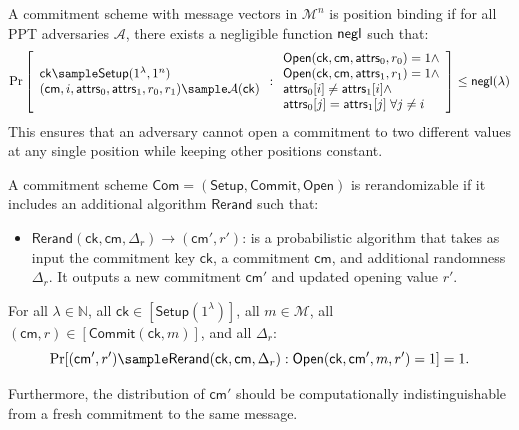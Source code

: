\begin{definition}\label{def:position-binding}
A commitment scheme with message vectors in $\mathcal{M}^n$ is position binding if for all PPT adversaries $\mathcal{A}$, there exists a negligible function $\mathsf{negl}$ such that:
\[
    \Pr
    \left[
        \begin{array}{l}
        \mathsf{ck} \sample \mathsf{Setup}(1^\lambda, 1^n) \\
        (\mathsf{cm}, i, \attrs_0, \attrs_1, r_0, r_1) \sample \mathcal{A}(\mathsf{ck}) 
        \end{array}
        : \begin{array}{l}
            \mathsf{Open}(\mathsf{ck}, \mathsf{cm}, \attrs_0, r_0) = 1 \land \\
            \mathsf{Open}(\mathsf{ck}, \mathsf{cm}, \attrs_1, r_1) = 1 \land \\
            \attrs_0[i] \neq \attrs_1[i] \land \\
            \attrs_0[j] = \attrs_1[j] \; \forall j \neq i
          \end{array}
    \right] \leq \negl(\lambda)
\]
This ensures that an adversary cannot open a commitment to two different values at any single position while keeping other positions constant.
\end{definition}


\begin{definition}[Rerandomizability]
A commitment scheme $\mathsf{Com} = (\mathsf{Setup}, \mathsf{Commit}, \mathsf{Open})$ is rerandomizable if it includes an additional algorithm $\mathsf{Rerand}$ such that:

\begin{itemize}
\item $\mathsf{Rerand}(\mathsf{ck}, \mathsf{cm}, \Delta_r) \rightarrow (\mathsf{cm}', r')$: is a probabilistic algorithm that takes as input the commitment key $\mathsf{ck}$, a commitment $\mathsf{cm}$, and additional randomness $\Delta_r$. It outputs a new commitment $\mathsf{cm}'$ and updated opening value $r'$.
\end{itemize}

For all $\lambda \in \mathbb{N}$, all $\mathsf{ck} \in [\mathsf{Setup}(1^\lambda)]$, all $m \in \mathcal{M}$, all $(\mathsf{cm}, r) \in [\mathsf{Commit}(\mathsf{ck}, m)]$, and all $\Delta_r$:
$$\Pr[(\mathsf{cm}', r') \sample \mathsf{Rerand}(\mathsf{ck}, \mathsf{cm}, \Delta_r) : \mathsf{Open}(\mathsf{ck}, \mathsf{cm}', m, r') = 1] = 1.$$

Furthermore, the distribution of $\mathsf{cm}'$ should be computationally indistinguishable from a fresh commitment to the same message.
\end{definition}



